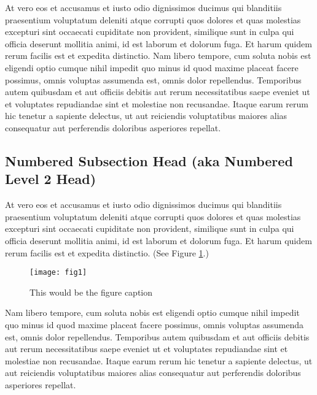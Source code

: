 At vero eos et accusamus et iusto odio dignissimos ducimus qui blanditiis praesentium voluptatum deleniti atque corrupti quos dolores et quas molestias excepturi sint occaecati cupiditate non provident, similique sunt in culpa qui officia deserunt mollitia animi, id est laborum et dolorum fuga. Et harum quidem rerum facilis est et expedita distinctio. Nam libero tempore, cum soluta nobis est eligendi optio cumque nihil impedit quo minus id quod maxime placeat facere possimus, omnis voluptas assumenda est, omnis dolor repellendus. Temporibus autem quibusdam et aut officiis debitis aut rerum necessitatibus saepe eveniet ut et voluptates repudiandae sint et molestiae non recusandae. Itaque earum rerum hic tenetur a sapiente delectus, ut aut reiciendis voluptatibus maiores alias consequatur aut perferendis doloribus asperiores repellat.

\subsection{Numbered Subsection Head (aka Numbered Level 2 Head)}

At vero eos et accusamus et iusto odio dignissimos ducimus qui blanditiis praesentium voluptatum deleniti atque corrupti quos dolores et quas molestias excepturi sint occaecati cupiditate non provident, similique sunt in culpa qui officia deserunt mollitia animi, id est laborum et dolorum fuga. Et harum quidem rerum facilis est et expedita distinctio. (See Figure \ref{fig1}.)\begin{figure}[tb]\begin{center}
    \texttt{[image: fig1]}\end{center} 
    \caption{This would be the figure caption}\label{fig1}       
\end{figure} Nam libero tempore, cum soluta nobis est eligendi optio cumque nihil impedit quo minus id quod maxime placeat facere possimus, omnis voluptas assumenda est, omnis dolor repellendus. Temporibus autem quibusdam et aut officiis debitis aut rerum necessitatibus saepe eveniet ut et voluptates repudiandae sint et molestiae non recusandae. Itaque earum rerum hic tenetur a sapiente delectus, ut aut reiciendis voluptatibus maiores alias consequatur aut perferendis doloribus asperiores repellat.  


